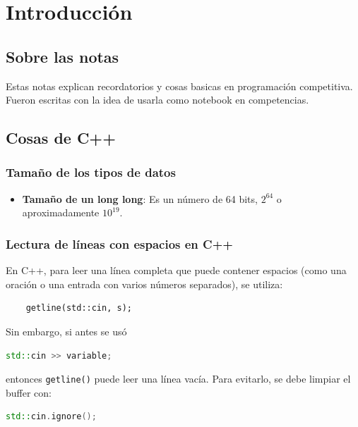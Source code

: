 \chapter{Introducción}

\section{Sobre las notas}
Estas notas explican recordatorios y cosas basicas en programación competitiva. 
Fueron escritas con la idea de usarla como notebook en competencias. 



\section{Cosas de C++}

\subsection{Tamaño de los tipos de datos}
\begin{itemize}
	\item \textbf{Tamaño de un long long}: Es un número de 64 bits, \( 2^{64} \) o aproximadamente \( 10^{19} \).
\end{itemize}

\subsection{Lectura de líneas con espacios en C++}

En C++, para leer una línea completa que puede contener espacios (como una oración o una entrada con varios números separados), se utiliza:

\begin{lstlisting}
	getline(std::cin, s);
\end{lstlisting}

Sin embargo, si antes se usó 

\begin{lstlisting}[language=C++]
	std::cin >> variable;
\end{lstlisting}

entonces \texttt{getline()} puede leer una línea vacía. Para evitarlo, se debe limpiar el buffer con:

\begin{lstlisting}[language=C++]
	std::cin.ignore();
\end{lstlisting}



